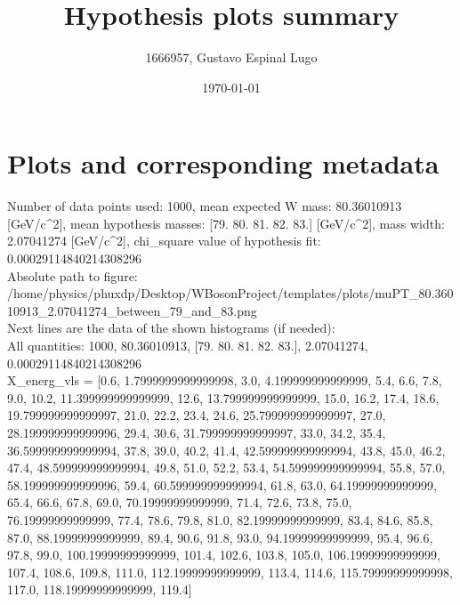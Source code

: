 \documentclass[12pt]{article}
\begin{document}
	\title{Hypothesis plots summary} %
	\author{1666957, Gustavo Espinal Lugo}
	\date{\today} %

	\maketitle
	
	\section*{Plots and corresponding metadata}
	Number of data points used: 1000, mean expected W mass: 80.36010913 [GeV/c^2], mean hypothesis masses: [79. 80. 81. 82. 83.] [GeV/c^2], mass width: 2.07041274 [GeV/c^2], chi_square value of hypothesis fit: 0.00029114840214308296\\
	Absolute path to figure: /home/physics/phuxdp/Desktop/WBosonProject/templates/plots/muPT_80.36010913_2.07041274_between_79_and_83.png\\
	Next lines are the data of the shown histograms (if needed): \\
	All quantities: 	1000, 80.36010913, [79. 80. 81. 82. 83.], 2.07041274, 0.00029114840214308296\\
	X_energ_vls = [0.6, 1.7999999999999998, 3.0, 4.199999999999999, 5.4, 6.6, 7.8, 9.0, 10.2, 11.399999999999999, 12.6, 13.799999999999999, 15.0, 16.2, 17.4, 18.6, 19.799999999999997, 21.0, 22.2, 23.4, 24.6, 25.799999999999997, 27.0, 28.199999999999996, 29.4, 30.6, 31.799999999999997, 33.0, 34.2, 35.4, 36.599999999999994, 37.8, 39.0, 40.2, 41.4, 42.599999999999994, 43.8, 45.0, 46.2, 47.4, 48.599999999999994, 49.8, 51.0, 52.2, 53.4, 54.599999999999994, 55.8, 57.0, 58.199999999999996, 59.4, 60.599999999999994, 61.8, 63.0, 64.19999999999999, 65.4, 66.6, 67.8, 69.0, 70.19999999999999, 71.4, 72.6, 73.8, 75.0, 76.19999999999999, 77.4, 78.6, 79.8, 81.0, 82.19999999999999, 83.4, 84.6, 85.8, 87.0, 88.19999999999999, 89.4, 90.6, 91.8, 93.0, 94.19999999999999, 95.4, 96.6, 97.8, 99.0, 100.19999999999999, 101.4, 102.6, 103.8, 105.0, 106.19999999999999, 107.4, 108.6, 109.8, 111.0, 112.19999999999999, 113.4, 114.6, 115.79999999999998, 117.0, 118.19999999999999, 119.4]\\
\end{document}
